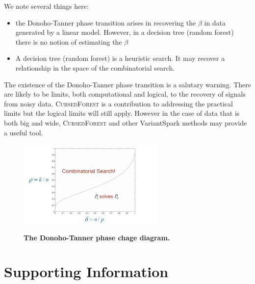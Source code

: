 \documentclass[10pt,letterpaper]{article}
\newcommand{\cursedforest}{\textsc{CursedForest}\xspace}
\begin{document}
We note several things here:
\begin{itemize}
\item the Donoho-Tanner phase transition arises in recovering the $\beta$ in data generated by a
  linear model. However, in a decision tree (random forest) there is no notion of estimating the $\beta$
\item A decision tree (random forest) is a heuristic search. It may recover a relationship in the space of the
  combinatorial search.
\end{itemize}

The existence of the  Donoho-Tanner phase transition is a salutary warning. There are likely to be limits, both
computational and logical, to the recovery of signals from noisy data. \cursedforest  is a contribution to addressing the
practical limits but the logical limits will still apply. However in the case of data that is both big and wide,
\cursedforest and other VariantSpark methods may provide a useful tool.


\begin{figure}[tbhp] 
 \begin{adjustwidth}{-1.00in}{0in}
    \caption{\textbf{The Donoho-Tanner phase chage diagram.}}
    \centering
    \includegraphics[totalheight=6cm]{./figs/phase.png} 
    \label{figure:phase-diagram-equivalence.png} 
    \vspace{4ex}
  \end{adjustwidth}
\end{figure}


\clearpage
\section{Supporting Information}

\end{document}
